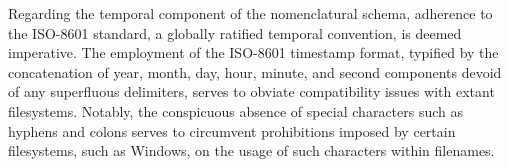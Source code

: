 Regarding the temporal component of the nomenclatural schema, adherence to the
ISO-8601 standard, a globally ratified temporal convention, is deemed
imperative. The employment of the ISO-8601 timestamp format, typified by the
concatenation of year, month, day, hour, minute, and second components devoid of
any superfluous delimiters, serves to obviate compatibility issues with extant
filesystems. Notably, the conspicuous absence of special characters such as
hyphens and colons serves to circumvent prohibitions imposed by certain
filesystems, such as Windows, on the usage of such characters within filenames.
